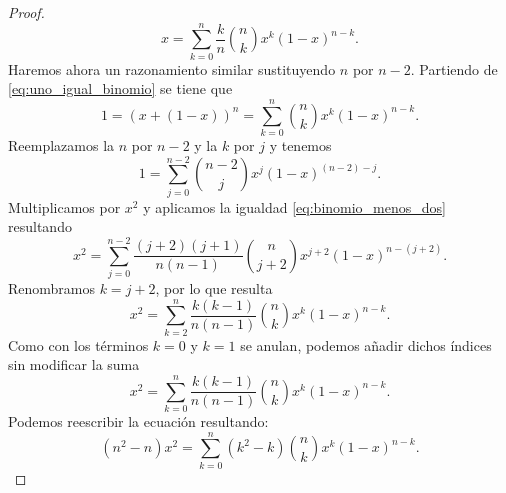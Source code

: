 \begin{proof}
    \begin{equation} \label{eq:desarrollo_binomio_uno}
        x = \sum_{k=0}^{n} \frac{k}{n} \binom{n}{k} x^{k} (1-x)^{n-k}.
    \end{equation}
    Haremos ahora un razonamiento similar sustituyendo $n$ por $n-2$.
    Partiendo de \eqref{eq:uno_igual_binomio} se tiene que 
    \begin{equation}
        1 = (x+ (1-x))^n = \sum_{k=0}^n \binom{n}{k} x^{k} (1-x)^{n-k}.
    \end{equation}
    Reemplazamos la $n$ por $n-2$ y la $k$ por $j$ y tenemos 
    \begin{equation}
        1 = \sum_{j=0}^{n-2} \binom{n-2}{j} x^{j} (1-x)^{(n-2)-j}.
    \end{equation}
    Multiplicamos por $x^2$ y aplicamos la igualdad \eqref{eq:binomio_menos_dos} resultando 
    \begin{equation}
        x^2 = \sum_{j=0}^{n-2} \frac{(j+2)(j+1)}{n(n-1)} \binom{n}{j+2} x^{j+2} (1-x)^{n-(j+2)}.
    \end{equation}
    Renombramos $k= j+2$, por lo que resulta
    \begin{equation}
        x^2 = \sum_{k=2}^{n} \frac{k(k-1)}{n(n-1)} \binom{n}{k} x^{k} (1-x)^{n-k}.
    \end{equation}
    Como con los términos $k=0$ y $k=1$ se anulan, podemos añadir dichos índices sin modificar la suma 
    \begin{equation}
        x^2 = \sum_{k=0}^{n} \frac{k(k-1)}{n(n-1)} \binom{n}{k} x^{k} (1-x)^{n-k}.
    \end{equation}
    Podemos reescribir la ecuación resultando: 
    \begin{equation}\label{eq:desarrollo_binomio_dos}
      (n^2 - n)  x^2 = \sum_{k=0}^{n} (k^2 - k) \binom{n}{k} x^{k} (1-x)^{n-k}.
    \end{equation}
    
    


\end{proof}
